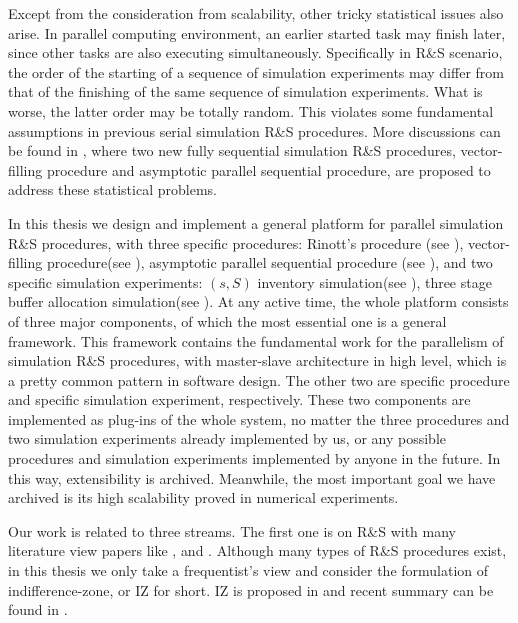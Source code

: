 Except from the consideration from scalability, other tricky statistical issues also arise. In parallel computing environment, an earlier started task may finish later, since other tasks are also executing simultaneously. Specifically in R\&S scenario, the order of the starting of a sequence of simulation experiments may differ from that of the finishing of the same sequence of simulation experiments. What is worse, the latter order may be totally random. This violates some fundamental assumptions in previous serial simulation R\&S procedures. More discussions can be found in \cite{ras-seq-parallel}, where two new fully sequential simulation R\&S procedures, vector-filling procedure and asymptotic parallel sequential procedure, are proposed to address these statistical problems.

In this thesis we design and implement a general platform for parallel simulation R\&S procedures, with three specific procedures: Rinott's procedure (see \cite{cistam1978rinott}), vector-filling procedure(see \cite{ras-seq-parallel}), asymptotic parallel sequential procedure (see \cite{ras-seq-parallel}), and two specific simulation experiments: $(s, S)$ inventory simulation(see \cite{cissac1985ss}), three stage buffer allocation simulation(see \cite{smoms93threestage}). At any active time, the whole platform consists of three major components, of which the most essential one is a general framework. This framework contains the fundamental work for the parallelism of simulation R\&S procedures, with master-slave architecture in high level, which is a pretty common pattern in software design. The other two are specific procedure and specific simulation experiment, respectively. These two components are implemented as plug-ins of the whole system, no matter the three procedures and two simulation experiments already implemented by us, or any possible procedures and simulation experiments implemented by anyone in the future. In this way, extensibility is archived. Meanwhile, the most important goal we have archived is its high scalability proved in numerical experiments.

Our work is related to three streams. The first one is on R\&S with many literature view papers like \cite{ras-recent-advances}, \cite{ehiorams06ras} and \cite{ms05ras}. Although many types of R\&S procedures exist, in this thesis we only take a frequentist’s view and consider the formulation of indifference-zone, or IZ for short. IZ is proposed in \cite{toams1954iz} and recent summary can be found in \cite{nyjws95iz}.

